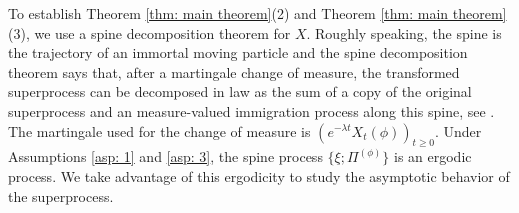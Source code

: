 \documentclass[12pt,a4paper]{amsart}
\theoremstyle{definition}
\numberwithin{equation}{section}
\begin{document}
To establish Theorem \ref{thm: main theorem}(2) and Theorem \ref{thm: main theorem}(3), we use a spine decomposition theorem for 	$X$.
Roughly speaking, the spine is the trajectory of an immortal moving particle and the spine decomposition theorem says that, after a martingale change of measure, the transformed superprocess can be decomposed in law as the sum of a copy of the original superprocess and an measure-valued immigration process along this spine, see \cite{EckhoffKyprianouWinkel2015Spines, EnglanderKyprianou2004Local, LiuRenSong2009Llog}.
The martingale used for the change of measure is $(e^{-\lambda t} X_t(\phi))_{t\geq 0}$.
Under Assumptions \ref{asp: 1} and \ref{asp: 3}, the spine process $\{\xi; \Pi^{(\phi)}\}$ is an ergodic process.
We take advantage of this ergodicity to study the asymptotic behavior of the superprocess.
	
\end{document}
